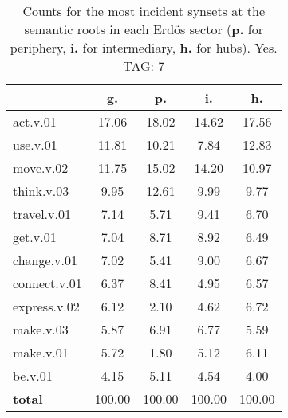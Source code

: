 \begin{table}[h!]
\begin{center}
\begin{tabular}{| l | c | c | c | c |}\hline
 & g. & p. & i. & h. \\\hline
act.v.01 & 17.06  & 18.02  & 14.62  & 17.56 \\\hline
use.v.01 & 11.81  & 10.21  & 7.84  & 12.83 \\\hline
move.v.02 & 11.75  & 15.02  & 14.20  & 10.97 \\\hline
think.v.03 & 9.95  & 12.61  & 9.99  & 9.77 \\\hline
travel.v.01 & 7.14  & 5.71  & 9.41  & 6.70 \\\hline
get.v.01 & 7.04  & 8.71  & 8.92  & 6.49 \\\hline
change.v.01 & 7.02  & 5.41  & 9.00  & 6.67 \\\hline
connect.v.01 & 6.37  & 8.41  & 4.95  & 6.57 \\\hline
express.v.02 & 6.12  & 2.10  & 4.62  & 6.72 \\\hline
make.v.03 & 5.87  & 6.91  & 6.77  & 5.59 \\\hline
make.v.01 & 5.72  & 1.80  & 5.12  & 6.11 \\\hline
be.v.01 & 4.15  & 5.11  & 4.54  & 4.00 \\\hline
{{\bf total}} & 100.00  & 100.00  & 100.00  & 100.00 \\\hline
\end{tabular}
\caption{Counts for the most incident synsets at the semantic roots in each Erd\"os sector ({\bf p.} for periphery, {\bf i.} for intermediary, {\bf h.} for hubs). Yes. TAG: 7}
\end{center}
\end{table}